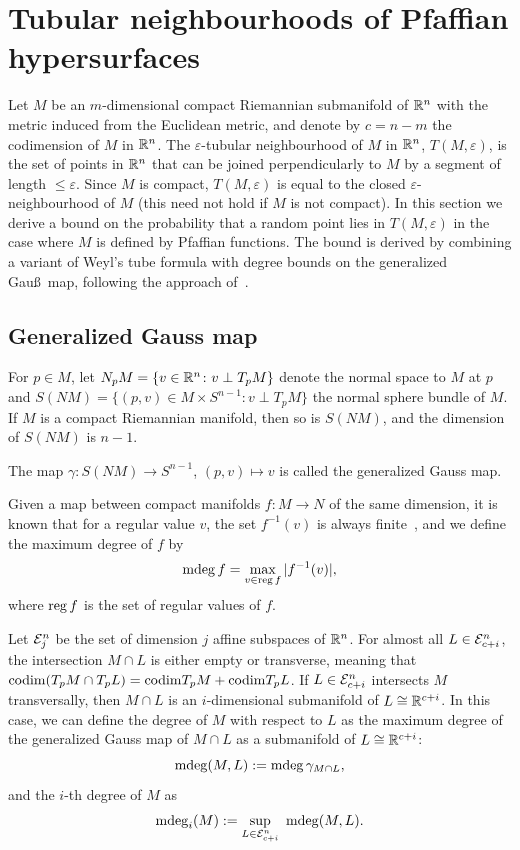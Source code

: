\section{Tubular neighbourhoods of Pfaffian hypersurfaces}\label{sec:tubular}
Let $M$ be an $m$-dimensional compact Riemannian submanifold of $\mathbb{R}^n$ with the metric induced from the Euclidean metric, and denote by $c = n - m$ the codimension of $M$ in $\mathbb{R}^n$.
The $\varepsilon$-tubular neighbourhood of $M$ in $\mathbb{R}^n$, $T(M, \varepsilon)$, is the set of points in $\mathbb{R}^n$ that can be joined perpendicularly to $M$ by a segment of length $\le \varepsilon$. Since $M$ is compact, $T(M, \varepsilon)$ is equal to the closed $\varepsilon$-neighbourhood of $M$ (this need not hold if $M$ is not compact).
In this section we derive a bound on the probability that a random point lies in $T(M, \varepsilon)$ in the case where $M$ is defined by Pfaffian functions. The bound is derived by combining
a variant of Weyl's tube formula with degree bounds on the generalized Gau\ss\ map, following the approach of~\cite{lotz2015volume}.

\subsection{Generalized Gauss map}
 For $p\in M$, let $N_{p} M = \{ v \in \mathbb{R}^n \colon v \perp T_{p} M \}$ denote the normal space to $M$ at $p$ and  $S(NM)=\{(p,v)\in M\times S^{n-1}\colon v \perp T_{p} M\}$ the normal sphere bundle of $M$. If $M$ is a compact Riemannian manifold, then so is $S(NM)$, and the dimension of $S(NM)$ is $n-1$. 

\begin{definition}
The map $\gamma\colon S(NM) \to S^{n-1}$, $(p, v) \mapsto v$ is called the generalized Gauss map.
\end{definition}

Given a map between compact manifolds $f\colon M \to N$ of the same dimension, it is known that for a regular value $v$, the set $f^{-1}(v)$ is always finite~\cite[\S 1]{milnor1997topology}, and we define the maximum degree of $f$ by
\begin{equation*}
\operatorname{\mathrm{mdeg}} f = \max_{v \in \operatorname{\mathrm{reg}} f} |f^{-1} (v)|,
\end{equation*}
where $\operatorname{\mathrm{reg}} f$ is the set of regular values of $f$. 

Let $\mathcal{E}^n_{j}$ be the set of dimension $j$ affine subspaces of $\mathbb{R}^n$. For almost all $L\in \mathcal{E}^n_{c+i}$, the intersection $M\cap L$ is either empty or transverse, meaning that $\mathrm{codim}(T_{p}M\cap T_{p}L)=\mathrm{codim} T_{p}M+\mathrm{codim} T_{p}L$.  If $L \in \mathcal{E}^n_{c+i}$ intersects $M$ transversally, then $M\cap L$ is an $i$-dimensional submanifold of $L \cong\mathbb{R}^{c+i}$. In this case, we can define the degree of $M$ with respect to $L$ as the maximum degree of the generalized Gauss map of $M\cap L$ as a submanifold of $L\cong \mathbb{R}^{c+i}$:
\begin{equation*}
\operatorname{\mathrm{mdeg}}(M, L) := \operatorname{\mathrm{mdeg}} \gamma_{M \cap L},
\end{equation*}
and the $i$-th degree of $M$ as 
\begin{equation*}
\md_i(M) := \sup_{L \in \cE^n_{c+i}} \ \md(M, L).
\end{equation*}

